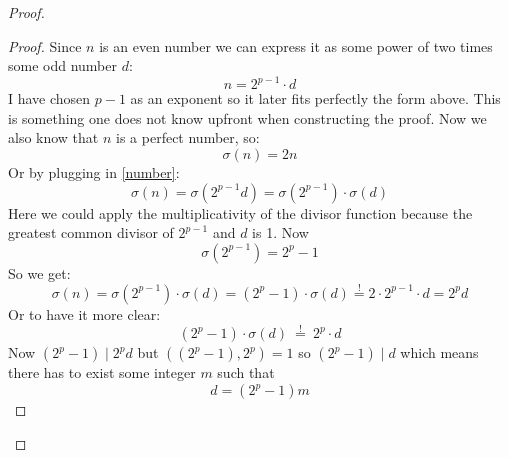 \documentclass{article}
\theoremstyle{definition}
\begin{document}
\begin{proof}
\begin{proof}
    Since $n$ is an even number we can express it as some power of two times some odd number $d$:
    \begin{equation}
        n = 2^{p-1}\cdot d
    \end{equation}
    I have chosen $p-1$ as an exponent so it later fits perfectly the form above. This is something one does not know upfront when constructing the proof.
    Now we also know that $n$ is a perfect number, so:
    \begin{equation} \label{number}
        \sigma(n) = 2n
    \end{equation}
    Or by plugging in \ref{number}:
    \begin{equation}
        \sigma(n)=\sigma(2^{p-1}d)=\sigma(2^{p-1})\cdot \sigma(d)
    \end{equation}
    Here we could apply the multiplicativity of the divisor function because the greatest common divisor of $2^{p-1}$ and $d$ is 1. Now
    \begin{equation}
        \sigma(2^{p-1}) = 2^p-1
    \end{equation}
    So we get:
    \begin{equation}
          \sigma(n)=\sigma(2^{p-1})\cdot \sigma(d) = (2^p-1)
          \cdot \sigma(d) \overset{!}{=} 2 \cdot 2^{p-1}\cdot d = 2^pd
    \end{equation}
    Or to have it more clear:
    \begin{equation} \label{clear}
        (2^p-1)
          \cdot \sigma(d) \: \overset{!}{=} \:  2^p \cdot d
    \end{equation}
    Now $(2^p-1)\mid 2^pd $ but $((2^p-1),2^p)=1$ so $(2^p-1)\mid d$ which means there has to exist some integer $m$ such that
    \begin{equation}
        d = (2^p-1)m
    \end{equation}


\end{proof}
\end{proof}
\end{document}
